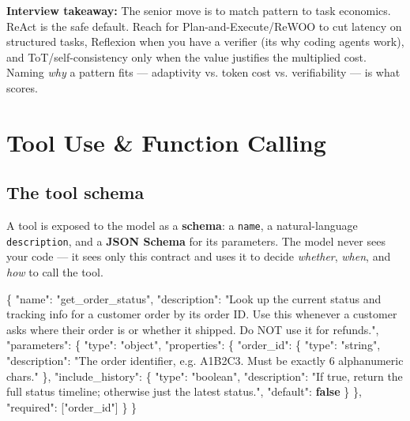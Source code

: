 \documentclass[11pt]{article}
\newenvironment{Shaded}{\begin{snugshade}}{\end{snugshade}}
\newcommand{\DataTypeTok}[1]{\textcolor[rgb]{0.16,0.50,0.73}{#1}}
\newcommand{\FunctionTok}[1]{\textcolor[rgb]{0.56,0.27,0.68}{#1}}
\newcommand{\KeywordTok}[1]{\textcolor[rgb]{0.81,0.81,0.76}{\textbf{#1}}}
\newcommand{\OtherTok}[1]{\textcolor[rgb]{0.15,0.68,0.38}{#1}}
\newcommand{\StringTok}[1]{\textcolor[rgb]{0.96,0.31,0.31}{#1}}
\begin{document}
\textbf{Interview takeaway:} The senior move is to match pattern to task economics. ReAct is the safe default. Reach for Plan-and-Execute/ReWOO to cut latency on structured tasks, Reflexion when you have a verifier (it\textquotesingle s why coding agents work), and ToT/self-consistency only when the value justifies the multiplied cost. Naming \emph{why} a pattern fits --- adaptivity vs. token cost vs. verifiability --- is what scores.

\section{Tool Use \& Function Calling}\label{tool-use--function-calling}

\subsection{The tool schema}\label{the-tool-schema}

A tool is exposed to the model as a \textbf{schema}: a \texttt{name}, a natural-language \texttt{description}, and a \textbf{JSON Schema} for its parameters. The model never sees your code --- it sees only this contract and uses it to decide \emph{whether}, \emph{when}, and \emph{how} to call the tool.


\begin{Shaded}
\begin{Highlighting}[]
\FunctionTok{\{}
  \DataTypeTok{"name"}\FunctionTok{:} \StringTok{"get\_order\_status"}\FunctionTok{,}
  \DataTypeTok{"description"}\FunctionTok{:} \StringTok{"Look up the current status and tracking info for a customer order by its order ID. Use this whenever a customer asks where their order is or whether it shipped. Do NOT use it for refunds."}\FunctionTok{,}
  \DataTypeTok{"parameters"}\FunctionTok{:} \FunctionTok{\{}
    \DataTypeTok{"type"}\FunctionTok{:} \StringTok{"object"}\FunctionTok{,}
    \DataTypeTok{"properties"}\FunctionTok{:} \FunctionTok{\{}
      \DataTypeTok{"order\_id"}\FunctionTok{:} \FunctionTok{\{}
        \DataTypeTok{"type"}\FunctionTok{:} \StringTok{"string"}\FunctionTok{,}
        \DataTypeTok{"description"}\FunctionTok{:} \StringTok{"The order identifier, e.g. \textquotesingle{}A1B2C3\textquotesingle{}. Must be exactly 6 alphanumeric chars."}
      \FunctionTok{\},}
      \DataTypeTok{"include\_history"}\FunctionTok{:} \FunctionTok{\{}
        \DataTypeTok{"type"}\FunctionTok{:} \StringTok{"boolean"}\FunctionTok{,}
        \DataTypeTok{"description"}\FunctionTok{:} \StringTok{"If true, return the full status timeline; otherwise just the latest status."}\FunctionTok{,}
        \DataTypeTok{"default"}\FunctionTok{:} \KeywordTok{false}
      \FunctionTok{\}}
    \FunctionTok{\},}
    \DataTypeTok{"required"}\FunctionTok{:} \OtherTok{[}\StringTok{"order\_id"}\OtherTok{]}
  \FunctionTok{\}}
\FunctionTok{\}}
\end{Highlighting}
\end{Shaded}
\end{document}
